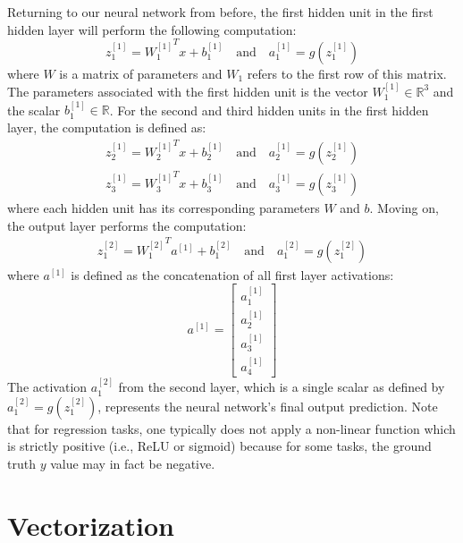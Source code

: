\documentclass{article}
\numberwithin{equation}{section}
\begin{document}
\noindent Returning to our neural network from before, the first hidden unit in the first hidden layer will perform the following computation:
\begin{equation}
z_1^{[1]} = {W^{[1]}_1}^T x + b^{[1]}_1 \quad\textrm{and}\quad a_1^{[1]} = g(z_1^{[1]})
\end{equation}
where $W$ is a matrix of parameters and $W_1$ refers to the first row of this matrix.  
The parameters associated with the first hidden unit is the vector $W^{[1]}_1 \in \mathbb{R}^3$ and the scalar $b^{[1]}_1 \in \mathbb{R}$. For the second and third hidden units in the first hidden layer, the computation is defined as:
\begin{align*}
z_2^{[1]} = {W^{[1]}_2}^T x + b^{[1]}_2 \quad\textrm{and}\quad a_2^{[1]} = g(z_2^{[1]}) \\
z_3^{[1]} = {W^{[1]}_3}^T x + b^{[1]}_3 \quad\textrm{and}\quad a_3^{[1]} = g(z_3^{[1]})
\end{align*}
where each hidden unit has its corresponding parameters $W$ and $b$. Moving on, the output layer performs the computation:
\begin{align}
z_1^{[2]} = {W^{[2]}_1}^T a^{[1]} + b^{[2]}_1 \quad\textrm{and}\quad a_1^{[2]} = g(z_1^{[2]})
\end{align}
where $a^{[1]}$ is defined as the concatenation of all first layer activations:
\begin{equation}
a^{[1]} = \left[ \begin{array}{c}
a^{[1]}_1 \\
a^{[1]}_2 \\
a^{[1]}_3 \\
a^{[1]}_4
\end{array}\right]
\end{equation}
The activation $a_1^{[2]}$ from the second layer, which is a single scalar as defined by $a_1^{[2]}=g(z_1^{[2]})$, represents the neural network's final output prediction. Note that for regression tasks, one typically does not apply a non-linear function which is strictly positive (i.e., ReLU or sigmoid) because for some tasks, the ground truth $y$ value may in fact be negative.

\section{Vectorization}
\end{document}
